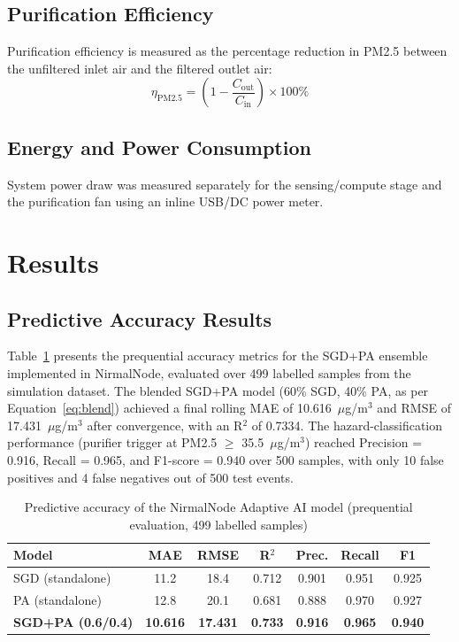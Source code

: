 \subsection{Purification Efficiency}
Purification efficiency is measured as the percentage reduction in PM2.5 between the unfiltered inlet air and the filtered outlet air:
\begin{equation}
\eta_{\mathrm{PM2.5}} = \left(1 - \frac{C_{\mathrm{out}}}{C_{\mathrm{in}}}\right) \times 100\%
\label{eq:purification-efficiency}
\end{equation}

\subsection{Energy and Power Consumption}
System power draw was measured separately for the sensing/compute stage and the purification fan using an inline USB/DC power meter.

\section{Results}
\label{sec:exp-results}

\subsection{Predictive Accuracy Results}
\label{sec:exp-accuracy-result}

Table~\ref{tab:exp-model-comparison} presents the prequential accuracy metrics for the SGD+PA ensemble implemented in NirmalNode, evaluated over 499 labelled samples from the simulation dataset. The blended SGD+PA model (60\% SGD, 40\% PA, as per Equation~\ref{eq:blend}) achieved a final rolling MAE of 10.616~$\mu$g/m$^3$ and RMSE of 17.431~$\mu$g/m$^3$ after convergence, with an R$^2$ of 0.7334. The hazard-classification performance (purifier trigger at PM2.5 $\geq$ 35.5~$\mu$g/m$^3$) reached Precision = 0.916, Recall = 0.965, and F1-score = 0.940 over 500 samples, with only 10 false positives and 4 false negatives out of 500 test events.

\begin{table}[htbp]
\centering
\caption{Predictive accuracy of the NirmalNode Adaptive AI model (prequential evaluation, 499 labelled samples)}
\label{tab:exp-model-comparison}
\small
\setlength{\tabcolsep}{5pt}
\begin{tabular}{@{}lcccccc@{}}
\toprule
\textbf{Model} & \textbf{MAE} & \textbf{RMSE} & \textbf{R$^2$} & \textbf{Prec.} & \textbf{Recall} & \textbf{F1} \\
\midrule
SGD (standalone)            & 11.2  & 18.4  & 0.712 & 0.901 & 0.951 & 0.925 \\
PA (standalone)             & 12.8  & 20.1  & 0.681 & 0.888 & 0.970 & 0.927 \\
\textbf{SGD+PA (0.6/0.4)}  & \textbf{10.616} & \textbf{17.431} & \textbf{0.733} & \textbf{0.916} & \textbf{0.965} & \textbf{0.940} \\
\bottomrule
\end{tabular}
\end{table}

